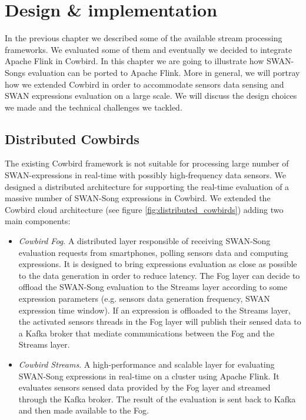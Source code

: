 \chapter{Design \& implementation}
In the previous chapter we described some of the available stream processing frameworks. We evaluated some of them and eventually we decided to integrate Apache Flink in Cowbird. In this chapter we are going to illustrate how SWAN-Songs evaluation can be ported to Apache Flink. More in general, we will portray how we extended Cowbird in order to accommodate sensors data sensing and SWAN expressions evaluation on a large scale. We will discuss the design choices we made and the technical challenges we tackled.  

\section{Distributed Cowbirds}
The existing Cowbird framework is not suitable for processing large number of SWAN-expressions in real-time with possibly high-frequency data sensors.
We designed a distributed architecture for supporting the real-time evaluation of a massive number of SWAN-Song expressions in Cowbird. We extended the Cowbird cloud architecture (see figure \ref{fig:distributed_cowbirds}) adding two main components:
\begin{itemize}
\item \emph{Cowbird Fog}. A distributed layer responsible of receiving SWAN-Song evaluation requests from smartphones, polling sensors data and computing expressions. It is designed to bring expressions evaluation as close as possible to the data generation in order to reduce latency. The Fog layer can decide to offload the SWAN-Song evaluation to the Streams layer according to some expression parameters (e.g. sensors data generation frequency, SWAN expression time window). If an expression is offloaded to the Streams layer, the activated sensors threads in the Fog layer will publish their sensed data to a Kafka broker that mediate communications between the Fog and the Streams layer.
\item \emph{Cowbird Streams}. A high-performance and scalable layer for evaluating SWAN-Song expressions in real-time on a cluster using Apache Flink. It evaluates sensors sensed data provided by the Fog layer and streamed through the Kafka broker. The result of the evaluation is sent back to Kafka and then made available to the Fog.
\end{itemize}

